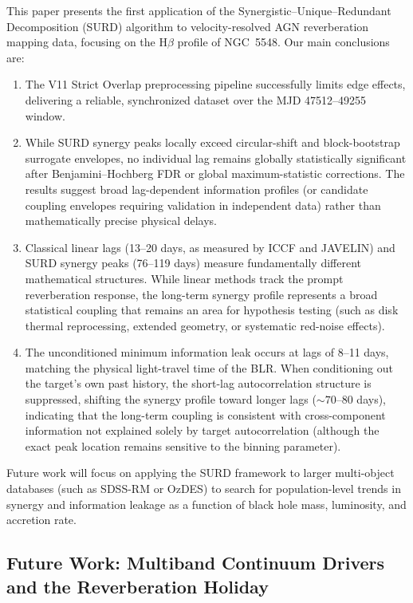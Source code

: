 \documentclass[fleqn,usenatbib]{mnras}
\begin{document}
This paper presents the first application of the Synergistic–Unique–Redundant Decomposition (SURD) algorithm to velocity-resolved AGN reverberation mapping data, focusing on the H\(\beta\) profile of NGC~5548. Our main conclusions are:
\begin{enumerate}
\item The V11 Strict Overlap preprocessing pipeline successfully limits edge effects, delivering a reliable, synchronized dataset over the MJD 47512--49255 window.
\item While SURD synergy peaks locally exceed circular-shift and block-bootstrap surrogate envelopes, no individual lag remains globally statistically significant after Benjamini–Hochberg FDR or global maximum-statistic corrections. The results suggest broad lag-dependent information profiles (or candidate coupling envelopes requiring validation in independent data) rather than mathematically precise physical delays.
\item Classical linear lags (13--20 days, as measured by ICCF and JAVELIN) and SURD synergy peaks (76--119 days) measure fundamentally different mathematical structures. While linear methods track the prompt reverberation response, the long-term synergy profile represents a broad statistical coupling that remains an area for hypothesis testing (such as disk thermal reprocessing, extended geometry, or systematic red-noise effects).
\item The unconditioned minimum information leak occurs at lags of 8--11 days, matching the physical light-travel time of the BLR. When conditioning out the target's own past history, the short-lag autocorrelation structure is suppressed, shifting the synergy profile toward longer lags ($\sim 70$--80 days), indicating that the long-term coupling is consistent with cross-component information not explained solely by target autocorrelation (although the exact peak location remains sensitive to the binning parameter).
\end{enumerate}

Future work will focus on applying the SURD framework to larger multi-object databases (such as SDSS-RM or OzDES) to search for population-level trends in synergy and information leakage as a function of black hole mass, luminosity, and accretion rate.

\subsection{Future Work: Multiband Continuum Drivers and the Reverberation Holiday}
\label{sec:future_multiband}
\end{document}
